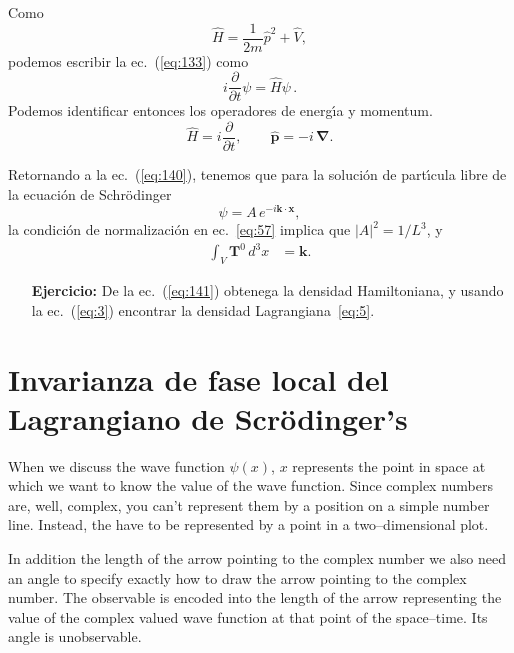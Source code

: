 Como
\begin{equation}
  \widehat H=\frac{1}{2m}\hat p^2+\widehat V,
\end{equation}
podemos escribir la ec.~(\ref{eq:133}) como
\begin{equation}
  i\frac{\partial}{\partial t}\psi=\widehat H \psi\,.
\end{equation}
Podemos identificar entonces los operadores de energ\'\i a y momentum.
\begin{equation}
  \label{eq:151}
  \widehat H=i\frac{\partial}{\partial t},\qquad \hat{\mathbf{p}}=-i\,\boldsymbol{\nabla}.
\end{equation}

Retornando a la ec.~(\ref{eq:140}), tenemos que para la soluci\'on de part\'\i cula libre de la ecuaci\'on de Schr\"odinger 
\begin{equation}
  \psi=A\,e^{-i\mathbf{k}\cdot\mathbf{x}},
\end{equation}
la condici\'on de normalizaci\'on en ec.~\eqref{eq:57} implica que $|A|^2=1/L^3$, y
\begin{align}
  \int_V \mathbf{T}^0\, d^3x&=\mathbf{k}.
\end{align}

\begin{itemize}
\item[\textbf{Ejercicio:}]  De la ec.~(\ref{eq:141}) obtenega la densidad Hamiltoniana, y usando la ec.~(\ref{eq:3}) encontrar la densidad Lagrangiana~\eqref{eq:5}.
\end{itemize}


\section{Invarianza de fase local del Lagrangiano de  Scrödinger's}


When we discuss the wave function $\psi(x)$, $x$ represents the point in space at which we want to know the value of the wave function. Since complex numbers are, well, complex, you can't represent them by a position on a simple number line. Instead, the have to be represented by a point in a two--dimensional plot. 

In addition the length of the arrow pointing to the complex number we also need an angle to specify exactly how to draw the arrow pointing to the complex number. The observable is encoded into the length of the arrow representing the value of the complex valued wave function at that point of the space--time. Its angle is unobservable.

